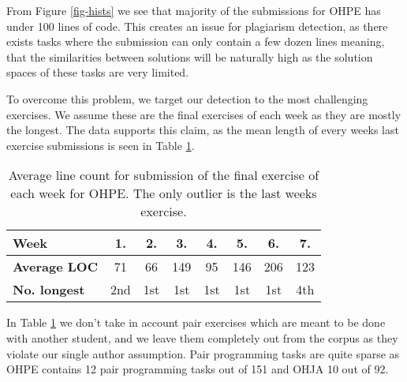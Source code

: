 \noindent
From Figure \ref{fig-hists} we see that majority of the submissions for OHPE has under 100 lines of code. This creates an issue for plagiarism detection, as there exists tasks where the submission can only contain a few dozen lines meaning, that the similarities between solutions will be naturally high as the solution spaces of these tasks are very limited. 

To overcome this problem, we target our detection to the most challenging exercises. We assume these are the final exercises of each week as they are mostly the longest. The data supports this claim, as the mean length of every weeks last exercise submissions is seen in Table \ref{tbl-OHPE-last-week}.

\begin{table}[ht]
\centering
\caption{Average line count for submission of the final exercise of each week for OHPE. The only outlier is the last weeks exercise.}
\label{tbl-OHPE-last-week}
\begin{tabular}{l|c|c|c|c|c|c|c}
\bf Week        & 1.  & 2.  & 3.   & 4.  & 5.   & 6.   & 7.   \\ \hline
\bf Average LOC & 71 & 66 & 149 & 95 & 146 & 206 & 123 \\ \hline
\bf No. longest & 2nd  & 1st & 1st  & 1st & 1st   & 1st   & 4th  
\end{tabular}
\end{table}


\noindent
In Table \ref{tbl-OHPE-last-week} we don't take in account pair exercises which are meant to be done with another student, and we leave them completely out from the corpus as they violate our single author assumption. Pair programming tasks are quite sparse as OHPE contains 12 pair programming tasks out of 151 and OHJA 10 out of 92.
